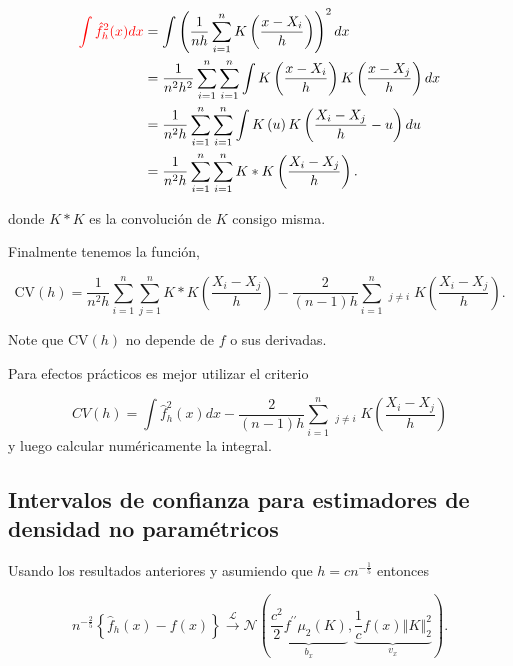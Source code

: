 \documentclass[12pt]{book}\usepackage[]{graphicx}\usepackage[]{color}
\theoremstyle{definition}
\theoremstyle{plain}
\begin{document}
\begin{align*}
	\textcolor{red}{\int\hat{f}_{h}^{2}(x)dx}
	  & =\int\left(\frac{1}{nh}\sum_{i=1}^{n}K\left( \frac{x-X_{i}}{h} \right)\right)^{2}dx                                    \\
	  & =\frac{1}{n^{2}h^{2}}\sum_{i=1}^{n}\sum_{i=1}^{n}\int K\left(\frac{x-X_{i}}{h}\right)K\left(\frac{x-X_{j}}{h}\right)dx \\
	  & =\frac{1}{n^{2}h}\sum_{i=1}^{n}\sum_{i=1}^{n}\int K\left(u\right)K\left(\frac{X_{i}-X_{j}}{h}-u\right)du               \\
	  & =\frac{1}{n^{2}h}\sum_{i=1}^{n}\sum_{i=1}^{n}K*K\left(\frac{X_{i}-X_{j}}{h}\right).
\end{align*}

donde $K*K$ es la convolución de  $K$  consigo misma.

\newpage
Finalmente tenemos la  función,

\[
	\mathrm{CV}(h)=\frac{1}{n^{2}h}\sum_{i=1}^{n}\sum_{j=1}^{n}K*K\left(\frac{X_{i}-X_{j}}{h}\right)-\frac{2}{(n-1)h}\sum_{i=1}^{n}\mathop{\sum_{j=1}^{n}}_{j\neq i}K\left( \frac{X_{i}-X_{j}}{h} \right).
\]

\begin{nota}{}{}
	Note que \(\mathrm{CV}(h)\) no depende de \(f\) o sus derivadas.
\end{nota}

\begin{nota}{}{}
	Para efectos prácticos es mejor utilizar el criterio

	\[
		CV(h)=\int\hat{f}_{h}^{2}(x)dx-\frac{2}{(n-1)h}\sum_{i=1}^{n}\mathop{\sum_{j=1}^{n}}_{j\neq i}K\left( \frac{X_{i}-X_{j}}{h} \right)
	\]
	y luego calcular numéricamente la integral.
\end{nota}

\newpage

\subsection{Intervalos de confianza para estimadores de densidad no paramétricos}

Usando los resultados anteriores y asumiendo que \(h=cn^{-\frac{1}{5}}\) entonces

\begin{equation*}
	n^{-\frac{2}{5}} \left\{ \hat{f}_{h}(x) -f(x)\right\}
	\xrightarrow{\mathcal{L}} \mathcal{N}\left(\underbrace{\frac{c^{2}}{2} f^{\prime\prime}
		\mu_{2}(K)}_{b_{x}}, \underbrace{\frac{1}{c}f(x) \left\Vert K \right\Vert_{2}^{2}}_{v_{x}}\right).
\end{equation*}
\end{document}
